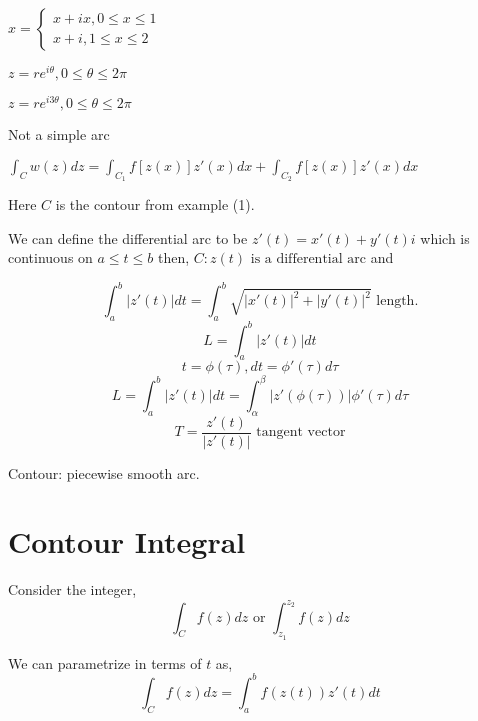 \begin{eg}
   $ x = \begin{cases}x + ix, 0 \le x \le 1 \\ x + i, 1 \le x \le 2\end{cases} $
\end{eg}

\begin{eg}
   $z = re^{i\theta}, 0 \le \theta \le 2\pi$
\end{eg}

\begin{eg}
   $z = re^{i3\theta}, 0 \le \theta \le 2\pi$

   Not a simple arc 
\end{eg}

\begin{eg}
   $\int_C w(z) dz = \int_{C_1} f[z(x)]z'(x) dx + \int_{C_2}f[z(x)] z'(x)dx$

   Here $C$ is the contour from example (1).
\end{eg}

We can define the differential arc to be $z'(t) = x'(t) + y'(t)i$ which is continuous on  $a \le t \le b$ then,  $C:z(t) \text{ is a differential arc}$ and 

$$ \int_a^b |z'(t)|dt = \int_a^b \sqrt{|x'(t)|^2 + |y'(t)|^2} \text{ length.}$$  
$$ L = \int_a^b |z'(t)|dt $$ 
$$ t = \phi(\tau), dt = \phi'(\tau)d\tau $$ 
$$ L = \int_a^b |z'(t)|dt = \int_{\alpha}^{\beta} |z'(\phi(\tau))| \phi'(\tau)d\tau$$ 
$$ T = \frac{z'(t)}{|z'(t)|} \text{ tangent vector}$$ 

Contour: piecewise smooth arc.

\section{Contour Integral}
Consider the integer, 
$$ \int_C f(z) dz \text{ or } \int_{z_1}^{z_2} f(z) dz $$ 

We can parametrize in terms of $t$ as, 
$$ \int_C f(z)dz = \int_a^b f(z(t))z'(t) dt $$ 


